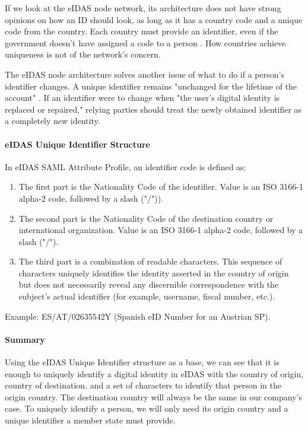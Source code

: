 If we look at the eIDAS node network, its architecture does not have strong opinions on how an ID should look, as long as it has a country code and a unique code from the country. Each country must provide an identifier, even if the government doesn't have assigned a code to a person \cite{eidas-saml}. How countries achieve uniqueness is not of the network's concern.

The eIDAS node architecture solves another issue of what to do if a person's identifier changes. A unique identifier remains "unchanged for the lifetime of the account" \cite{eidas-saml}. If an identifier were to change when "the user's digital identity is replaced or repaired," relying parties should treat the newly obtained identifier as a completely new identity.

\paragraph{eIDAS Unique Identifier Structure} In eIDAS SAML Attribute Profile, an identifier code is defined as:
\begin{enumerate}
  \item The first part is the Nationality Code of the identifier. Value is an ISO 3166-1 alpha-2 code, followed by a slash ("/")).
  \item The second part is the Nationality Code of the destination country or international organization. Value is an ISO 3166-1 alpha-2 code, followed by a slash ("/").
  \item The third part is a combination of readable characters. This sequence of characters uniquely identifies the identity asserted in the country of origin but does not necessarily reveal any discernible correspondence with the subject's actual identifier (for example, username, fiscal number, etc.).
\end{enumerate}

Example: ES/AT/02635542Y (Spanish eID Number for an Austrian SP).

\paragraph{Summary} Using the eIDAS Unique Identifier structure as a base, we can see that it is enough to uniquely identify a digital identity in eIDAS with the country of origin, country of destination, and a set of characters to identify that person in the origin country. The destination country will always be the same in our company's case. To uniquely identify a person, we will only need its origin country and a unique identifier a member state must provide.

